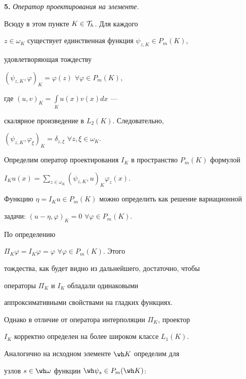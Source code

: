 {\bf 5.} {\it Оператор проектирования на элементе.}


Всюду в этом пункте $K \in {\cal T}_h$. Для каждого 


$z \in \omega_K$ существует единственная функция $\psi_{z,K} \in P_m(K)$, 


удовлетворяющая тождеству 




${(\psi_{z,K}, \varphi)}_K = \varphi(z)$ $\forall \varphi \in P_m(K)$,




где ${(u,v)}_K=\int \limits_{K} u(x)v(x)dx$ ---


скалярное произведение в $L_2(K)$. Следовательно,


${(\psi_{z,K}, \varphi_\xi)}_K=\delta_{z,\xi}$ $\forall z, \xi \in \omega_K$. 


Определим оператор проектирования $I_K$ в пространство $P_m(K)$ формулой 




$I_K u(x) = \sum \limits_{z \in \omega_K} {(\psi_{z,K},u)}_K \varphi_z(x)$.




Функцию $\eta=I_Ku \in P_m(K)$ можно определить как решение вариационной 


задачи: ${(u-\eta,\varphi)}_K=0$ $\forall \varphi \in P_m(K)$. 


По определению


$\Pi_K \varphi = I_K \varphi =\varphi$ $\forall \varphi \in P_m(K)$. Этого 


тождества, как будет видно из дальнейшего, достаточно, чтобы 


операторы $\Pi_K$ и $I_K$ обладали одинаковыми 


аппроксимативными свойствами на гладких функциях. 


Однако в отличие от оператора интерполяции $\Pi_K$, проектор 


$I_K$ корректно определен на более широком классе $L_1(K)$. 





Аналогично на исходном элементе $\wh K$ определим для 


узлов $s \in \wh \omega$ функции $\wh \psi_s \in P_m(\wh K)$: 


